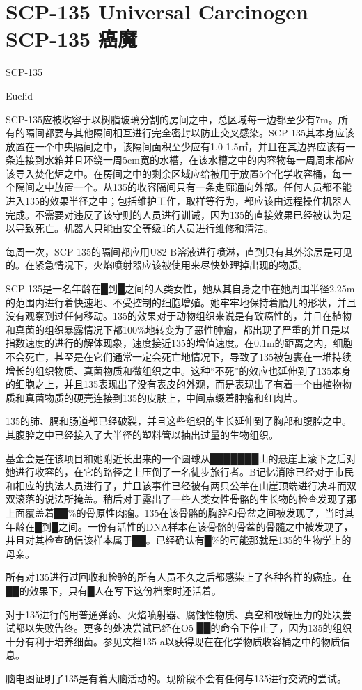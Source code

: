 \chapter[SCP-135 癌魔]{
    SCP-135 Universal Carcinogen\\
    SCP-135 癌魔
}

\label{chap:SCP-135}

SCP-135

Euclid

SCP-135应被收容于以树脂玻璃分割的房间之中，总区域每一边都至少有7m。所有的隔间都要与其他隔间相互进行完全密封以防止交叉感染。SCP-135其本身应该放置在一个中央隔间之中，该隔间面积至少应有1.0-1.5㎡，并且在其边界应该有一条连接到水箱并且环绕一周5cm宽的水槽，在该水槽之中的内容物每一周周末都应该导入焚化炉之中。在房间之中的剩余区域应给被用于放置5个化学收容桶，每一个隔间之中放置一个。从135的收容隔间只有一条走廊通向外部。任何人员都不能进入135的效果半径之中；包括维护工作，取样等行为，都应该由远程操作机器人完成。不需要对违反了该守则的人员进行训诫，因为135的直接效果已经被认为足以导致死亡。机器人只能由安全等级1的人员进行维修和清洁。

每周一次，SCP-135的隔间都应用U82-B溶液进行喷淋，直到只有其外涂层是可见的。在紧急情况下，火焰喷射器应该被使用来尽快处理掉出现的物质。

SCP-135是一名年龄在█到█之间的人类女性，她从其自身之中在她周围半径2.25m的范围内进行着快速地、不受控制的细胞增殖。她牢牢地保持着胎儿的形状，并且没有观察到过任何移动。135的效果对于动物组织来说是有致癌性的，并且在植物和真菌的组织暴露情况下都100\%地转变为了恶性肿瘤，都出现了严重的并且是以指数速度的进行的解体现象，速度接近135的增值速度。在0.1m的距离之内，细胞不会死亡，甚至是在它们通常一定会死亡地情况下，导致了135被包裹在一堆持续增长的组织物质、真菌物质和微组织之中。这种“不死”的效应也延伸到了135本身的细胞之上，并且135表现出了没有表皮的外观，而是表现出了有着一个由植物物质和真菌物质的硬壳连接到135的皮肤上，中间点缀着肿瘤和红肉片。

135的肺、膈和肠道都已经破裂，并且这些组织的生长延伸到了胸部和腹腔之中。其腹腔之中已经接入了大半径的塑料管以抽出过量的生物组织。

基金会是在该项目和她附近长出来的一个圆球从███████山的悬崖上滚下之后对她进行收容的，在它的路径之上压倒了一名徒步旅行者。B记忆消除已经对于市民和相应的执法人员进行了，并且该事件已经被有两只公羊在山崖顶端进行决斗而双双滚落的说法所掩盖。稍后对于露出了一些人类女性骨骼的生长物的检查发现了那上面覆盖着██\%的骨原性肉瘤。135在该骨骼的胸腔和骨盆之间被发现了，当时其年龄在█到█之间。一份有活性的DNA样本在该骨骼的骨盆的骨髓之中被发现了，并且对其检查确信该样本属于██。已经确认有█\%的可能那就是135的生物学上的母亲。

所有对135进行过回收和检验的所有人员不久之后都感染上了各种各样的癌症。在██的效果下，只有█人在写下这份档案时还活着。

对于135进行的用普通弹药、火焰喷射器、腐蚀性物质、真空和极端压力的处决尝试都以失败告终。更多的处决尝试已经在O5-██的命令下停止了，因为135的组织十分有利于培养细菌。参见文档135-a以获得现在在化学物质收容桶之中的物质信息。

脑电图证明了135是有着大脑活动的。现阶段不会有任何与135进行交流的尝试。
